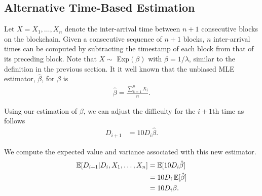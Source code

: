 \subsection{Alternative Time-Based Estimation}\label{sec:time-based}


 Let $X = X_1, \ldots, X_n$ denote the inter-arrival time between $n+1$ consecutive blocks on the blockchain. Given a consecutive sequence of $n+1$ blocks, $n$ inter-arrival times can be computed by subtracting the timestamp of each block from that of its preceding block. Note that $X \sim$ Exp$(\beta)$ with $\beta = 1/\lambda$, similar to the definition in the previous section. It it well known that the unbiased MLE estimator, $\hat{\beta}$, for $\beta$ is
\begin{align}
\hat{\beta} = \frac{\sum_{k=1}^{n} X_i}{n}. \label{eq:beta-hat}
\end{align}

Using our estimation of $\beta$, we can adjust the difficulty for the $i+1$th time as follows 
\begin{align}
D_{i+1} &= 10 D_i \hat{\beta}.
\end{align}

\noindent We compute the expected value and variance associated with this new estimator.
\begin{align}
\operatorname{\mathbb{E}}[D_{i+1} | D_{i}, X_1, \dots, X_{n}] &= \operatorname{\mathbb{E}}[10 D_i \hat{\beta}] \\
&= 10 D_i \operatorname{\mathbb{E}}[\hat{\beta}] \\
&= 10 D_i\beta.
\end{align}


